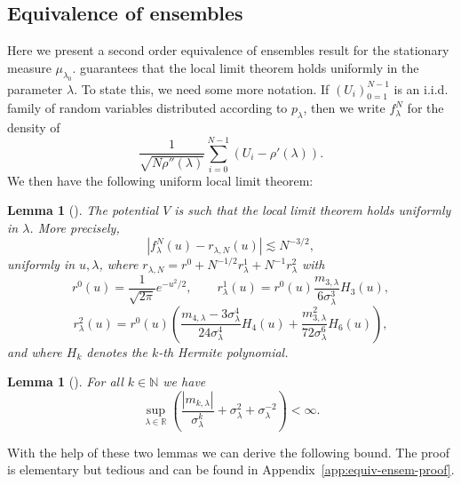 \documentclass[11pt, a4paper]{article}
\newcommand{\nocomma}{}
\newtheorem{lemma}[theorem]{Lemma}
\newcommand{\1}{\mathbf{1}}
\begin{document}
\subsection{Equivalence of ensembles}\label{sec:equivEnsem}

Here we present a second order equivalence of ensembles result for the stationary measure $\mu_{\lambda_0}$. \assumptionV guarantees that the local limit
theorem holds uniformly in the parameter $\lambda$. To state this, we need
some more notation. If $(U_i)_{0 = 1}^{N - 1}$ is an i.i.d. family of random
variables distributed according to $p_{\lambda}$, then we write
$f^N_{\lambda}$ for the density of
\[ \frac{1}{\sqrt{N \rho'' (\lambda)}} \sum_{i = 0}^{N - 1} (U_i - \rho'
   (\lambda)) \nocomma. \]
We then have the following uniform local limit theorem:

\begin{lemma}[{\cite[Theorem~2.1]{bib:caputo}}]\label{lem:LLT}
  The potential $V$ is such that the local limit theorem holds uniformly in
  $\lambda$. More precisely,
  \[ | f^N_{\lambda} (u) - r_{\lambda, N} (u) | \lesssim N^{- 3 / 2}, \]
  uniformly in $u, \lambda$, where $r_{\lambda, N} = r^0 + N^{- 1 / 2}
  r_{\lambda}^1 + N^{- 1} r_{\lambda}^2$ with
  \[ r^0 (u) = \frac{1}{\sqrt{2 \pi}} e^{- u^2 / 2}, \hspace{2em}
     r^1_{\lambda} (u) = r^0 (u) \frac{m_{3, \lambda}}{6 \sigma^3_{\lambda}}
     H_3 (u), \]
  \[ r^2_{\lambda} (u) = r^0 (u) \left( \frac{m_{4, \lambda} - 3
     \sigma_{\lambda}^4}{24 \sigma_{\lambda}^4} H_4 (u) + \frac{m_{3,
     \lambda}^2}{72 \sigma^6_{\lambda}} H_6 (u) \right), \]
  and where $H_k$ denotes the $k$-th Hermite polynomial.
\end{lemma}

\begin{lemma}[{\cite[Lemma~2.2 and Lemma~2.4]{bib:caputo}}]
  \label{lem:UB}
  For all $k \in \mathbb{N}$ we have
  \[ \sup_{\lambda \in \mathbb{R}} \left( \frac{| m_{k, \lambda}
     |}{\sigma_{\lambda}^k} + \sigma^2_{\lambda} +
     \sigma^{- 2}_{\lambda} \right) < \infty . \]
\end{lemma}

With the help of these two lemmas we can derive the following bound. The proof is elementary but tedious and can be found in Appendix~\ref{app:equiv-ensem-proof}.
\end{document}
